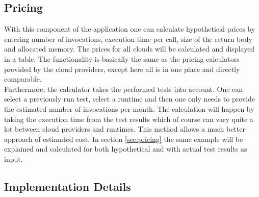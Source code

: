 \subsection{Pricing}
With this component of the application one can calculate hypothetical prices by entering number of invocations, execution time per call, size of the return body and allocated memory. The prices for all clouds will be calculated and displayed in a table. The functionality is basically the same as the pricing calculators provided by the cloud providers, except here all is in one place and directly comparable.\\
Furthermore, the calculator takes the performed tests into account. One can select a previously run test, select a runtime and then one only needs to provide the estimated number of invocations per month. The calculation will happen by taking the execution time from the test results which of course can vary quite a lot between cloud providers and runtimes. This method allows a much better approach of estimated cost. In section \ref{sec:pricing} the same example will be explained and calculated for both hypothetical and with actual test results as input.


\subsection{Implementation Details}
